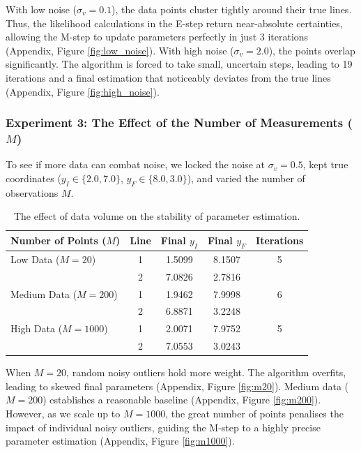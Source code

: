 \documentclass{article}
\begin{document}
With low noise ($\sigma_v = 0.1$), the data points cluster tightly around their true lines. Thus, the likelihood calculations in the E-step return near-absolute certainties, allowing the M-step to update parameters perfectly in just 3 iterations (Appendix, Figure \ref{fig:low_noise}). With high noise ($\sigma_v = 2.0$), the points overlap significantly. The algorithm is forced to take small, uncertain steps, leading to 19 iterations and a final estimation that noticeably deviates from the true lines (Appendix, Figure \ref{fig:high_noise}).

\subsubsection{Experiment 3: The Effect of the Number of Measurements ($M$)}
To see if more data can combat noise, we locked the noise at $\sigma_v = 0.5$, kept true coordinates ($y_I \in \{2.0, 7.0\}$, $y_F \in \{8.0, 3.0\}$), and varied the number of observations $M$.

\begin{table}[H]
\centering
\begin{tabular}{|l|c|c|c|c|}
\hline
\textbf{Number of Points ($M$)} & \textbf{Line} & \textbf{Final $y_I$} & \textbf{Final $y_F$} & \textbf{Iterations} \\ \hline
Low Data ($M = 20$) & 1 & 1.5099 & 8.1507 & 5 \\ 
 & 2 & 7.0826 & 2.7816 & \\ \hline
Medium Data ($M = 200$) & 1 & 1.9462 & 7.9998 & 6 \\ 
 & 2 & 6.8871 & 3.2248 & \\ \hline
High Data ($M = 1000$) & 1 & 2.0071 & 7.9752 & 5 \\ 
 & 2 & 7.0553 & 3.0243 & \\ \hline
\end{tabular}
\caption{The effect of data volume on the stability of parameter estimation.}
\label{tab:measurements}
\end{table}

When $M=20$, random noisy outliers hold more weight. The algorithm overfits, leading to skewed final parameters (Appendix, Figure \ref{fig:m20}). Medium data ($M=200$) establishes a reasonable baseline (Appendix, Figure \ref{fig:m200}). However, as we scale up to $M=1000$, the great number of points penalises the impact of individual noisy outliers, guiding the M-step to a highly precise parameter estimation (Appendix, Figure \ref{fig:m1000}).
\end{document}
